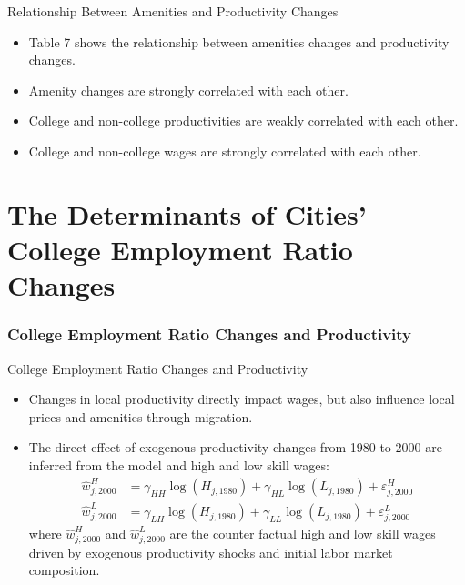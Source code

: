 \documentclass[aspectratio=169]{beamer}
\begin{document}

\begin{frame}{Relationship Between Amenities and Productivity Changes}

\begin{itemize}
    \item<1-> Table 7 shows the relationship between amenities changes and productivity changes.
    \item<2-> Amenity changes are strongly correlated with each other.
    \item<3-> College and non-college productivities are weakly correlated with each other.
    \item<4-> College and non-college wages are strongly correlated with each other.
\end{itemize}
    
\end{frame}


\section{The Determinants of Cities’ College Employment Ratio Changes}

\subsubsection{College Employment Ratio Changes and Productivity}


\begin{frame}{College Employment Ratio Changes and Productivity}

\begin{itemize}
    \item<1-> Changes in local productivity directly impact wages, but also influence local prices and amenities through migration.
    \item<2-> The direct effect of exogenous productivity changes from 1980 to 2000 are inferred from the model and high and low skill wages:
    \begin{equation*}
        \begin{split}
            \hat{w}_{j,2000}^{H} &= \gamma_{HH} \log\left( H_{j,1980} \right) + \gamma_{HL} \log\left( L_{j,1980} \right) + \varepsilon_{j,2000}^{H} \\
            \hat{w}_{j,2000}^{L} &= \gamma_{LH} \log\left( H_{j,1980} \right) + \gamma_{LL} \log\left( L_{j,1980} \right) + \varepsilon_{j,2000}^{L}
        \end{split}
    \end{equation*}
    where  $ \hat{w}_{j,2000}^{H} $ and $ \hat{w}_{j,2000}^{L} $ are the counter factual high and low skill wages driven by exogenous productivity shocks and initial labor market composition.
\end{itemize}
    
\end{frame}
\end{document}
